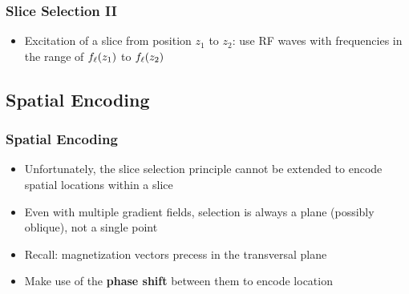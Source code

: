 \begin{frame}
	\frametitle{Slice Selection II}
	
	\begin{itemize}
		\item Excitation of a slice from position $z_1$ to $z_2$: use RF waves with frequencies in the range of $f_\ell(z_1)$ to $f_\ell(z_2)$
	\end{itemize}
	
	\begin{center}
		\begingroup
		
		\endgroup
	\end{center}
\end{frame}




\subsection{Spatial Encoding} %
\label{sub:spatial_encoding}

\begin{frame}
	\frametitle{Spatial Encoding}
	
	\begin{itemize}
		\item Unfortunately, the slice selection principle cannot be extended to encode spatial locations within a slice
		\item Even with multiple gradient fields, selection is always a plane (possibly oblique), not a single point
		
		\vspace{2ex}
		
		\item Recall: magnetization vectors precess in the transversal plane
		\item Make use of the \textbf{phase shift} between them to encode location
		
		\begin{center}
		\end{center}
	\end{itemize}
\end{frame}

